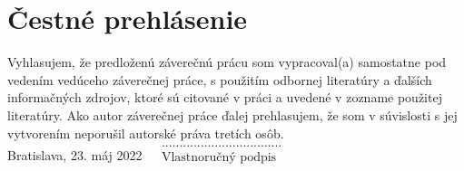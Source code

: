 \null
\vfill
\noindent
\section*{Čestné prehlásenie}

Vyhlasujem, že predloženú záverečnú prácu som vypracoval(a) samostatne pod vedením vedúceho záverečnej práce, s použitím odbornej literatúry a ďalších informačných zdrojov, ktoré sú citované v práci a uvedené v zozname použitej literatúry. Ako autor záverečnej práce ďalej prehlasujem, že som v súvislosti s jej vytvorením neporušil autorské práva tretích osôb.\\

\noindent Bratislava, 23. máj 2022 \hfill $\begin{array}{rl}
                                          &\text{..................................}\\
                                          &\text{Vlastnoručný podpis}\\
                                           \end{array}$
\cleardoublepage


	
